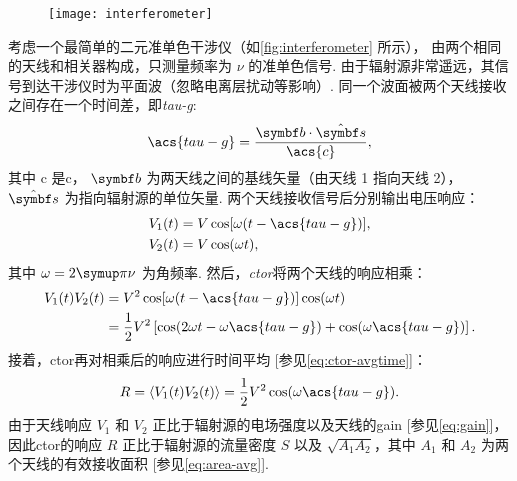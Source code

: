 \begin{figure}[htp]
  \centering
  \texttt{[image: interferometer]}
  \label{fig:interferometer}
\end{figure}

考虑一个最简单的二元准单色干涉仪（如\autoref{fig:interferometer} 所示），
由两个相同的天线和相关器构成，只测量频率为 $\nu$ 的准单色信号.
由于辐射源非常遥远，其信号到达干涉仪时为平面波（忽略电离层扰动等影响）.
同一个波面被两个天线接收之间存在一个时间差，即\emph{\acf{tau-g}}:
\begin{equation}
  \label{eq:tau-g}
  \acs{tau-g} = \frac{\B{b} \cdot \hat{\B{s}}}{\acs{c}},
\end{equation}
其中 \acs{c} 是\acl{c}，
$\B{b}$ 为两天线之间的基线矢量（由天线 1 指向天线 2），
$\hat{\B{s}}$ 为指向辐射源的单位矢量.
两个天线接收信号后分别输出电压响应：
\begin{align}
  V_1(t) &= V \cos [\omega (t - \acs{tau-g})], \\
  V_2(t) &= V \cos (\omega t),
\end{align}
其中 $\omega = 2\Cpi\nu$ 为角频率.
然后，\emph{\acf{ctor}}将两个天线的响应相乘：
\begin{align}
  V_1(t) V_2(t) &= V^2 \cos [\omega (t - \acs{tau-g})] \cos (\omega t) \\
    &= \frac{1}{2} V^2 \left[ \cos (2\omega t - \omega \acs{tau-g})
      + \cos (\omega \acs{tau-g}) \right].
\end{align}
接着，\ac{ctor}再对相乘后的响应进行时间平均 [参见\autoref{eq:ctor-avgtime}]：
\begin{equation}
  \label{eq:resp-corr}
  R = \langle V_1(t) V_2(t) \rangle
    = \frac{1}{2} V^2 \cos (\omega \acs{tau-g}).
\end{equation}
由于天线响应 $V_1$ 和 $V_2$ 正比于辐射源的电场强度以及天线的\ac{gain}
[参见\autoref{eq:gain}]，
因此\ac{ctor}的响应 $R$ 正比于辐射源的流量密度 $S$
以及 $\sqrt{A_1 A_2}$，其中 $A_1$ 和 $A_2$ 为两个天线的有效接收面积
[参见\autoref{eq:area-avg}].

